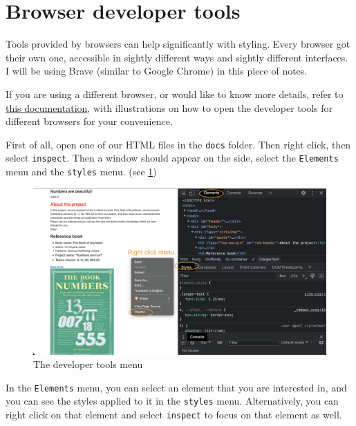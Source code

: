 \section{Browser developer tools} 

Tools provided by browsers can help significantly with styling. Every browser got their own one, accessible in sightly different ways and sightly different interfaces. I will be using Brave (similar to Google Chrome) in this piece of notes.

If you are using a different browser, or would like to know more details, refer to \href{https://www.hostinger.co.uk/tutorials/website/how-to-inspect-and-change-style-using-google-chrome}{this documentation}, with illustrations on how to open the developer tools for different browsers for your convenience.
\vspace{6mm}

First of all, open one of our HTML files in the \texttt{docs} folder. Then right click, then select \texttt{inspect}. Then a window should appear on the side, select the \texttt{Elements} menu and the \texttt{styles} menu. (see \cref{fig:devtools})

\begin{figure}[h]
\centering
\includegraphics[width=14cm]{images/chn6-devtools.png}
\caption{The developer tools menu}
\label{fig:devtools}
\end{figure}

In the \texttt{Elements} menu, you can select an element that you are interested in, and you can see the styles applied to it in the \texttt{styles} menu. Alternatively, you can right click on that element and select \texttt{inspect} to focus on that element as well.
\vspace{6mm}

